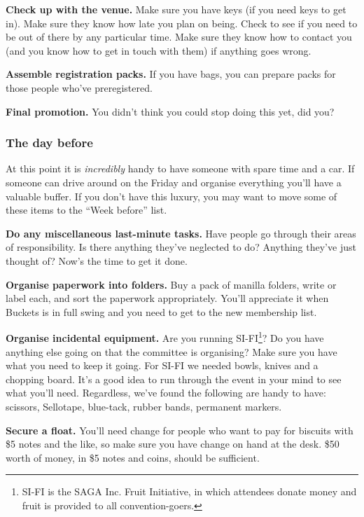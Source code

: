 \textbf{Check up with the venue.} Make sure you have keys (if you need keys to get in). Make sure they know how late you plan on being. Check to see if you need to be out of there by any particular time. Make sure they know how to contact you (and you know how to get in touch with them) if anything goes wrong.

\textbf{Assemble registration packs.} If you have bags, you can prepare packs for those people who've preregistered.

\textbf{Final promotion.} You didn't think you could stop doing this yet, did you?

\subsubsection{The day before}

At this point it is \textit{incredibly} handy to have someone with spare time and a car. If someone can drive around on the Friday and organise everything you'll have a valuable buffer. If you don't have this luxury, you may want to move some of these items to the ``Week before'' list.

\textbf{Do any miscellaneous last-minute tasks.} Have people go through their areas of responsibility. Is there anything they've neglected to do? Anything they've just thought of? Now's the time to get it done.

\textbf{Organise paperwork into folders.} Buy a pack of manilla folders, write or label each, and sort the paperwork appropriately. You'll appreciate it when Buckets is in full swing and you need to get to the new membership list.

\textbf{Organise incidental equipment.} Are you running SI-FI\footnote{SI-FI is the SAGA Inc. Fruit Initiative, in which attendees donate money and fruit is provided to all convention-goers.}? Do you have anything else going on that the committee is organising? Make sure you have what you need to keep it going. For SI-FI we needed bowls, knives and a chopping board. It's a good idea to run through the event in your mind to see what you'll need. Regardless, we've found the following are handy to have: scissors, Sellotape, blue-tack, rubber bands, permanent markers.

\textbf{Secure a float.} You'll need change for people who want to pay for biscuits with \$5 notes and the like, so make sure you have change on hand at the desk. \$50 worth of money, in \$5 notes and coins, should be sufficient.

